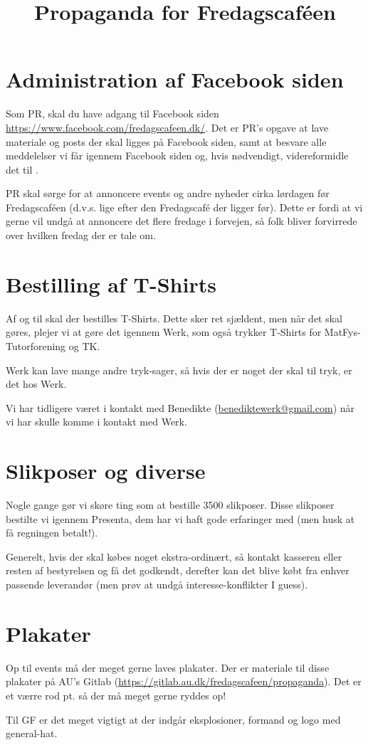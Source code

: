 

\title{Propaganda for Fredagscaféen}
\date{}



\maketitle

\section{Administration af Facebook siden}
Som PR, skal du have adgang til Facebook siden \url{https://www.facebook.com/fredagscafeen.dk/}. Det er PR's opgave at lave materiale og posts der skal ligges på Facebook siden, samt at besvare alle meddelelser vi får igennem Facebook siden og, hvis nødvendigt, videreformidle det til \bestmail.

PR skal sørge for at annoncere events og andre nyheder cirka lørdagen før Fredagscaféen (d.v.s. lige efter den Fredagscafé der ligger før). Dette er fordi at vi gerne vil undgå at annoncere det flere fredage i forvejen, så folk bliver forvirrede over hvilken fredag der er tale om.

\section{Bestilling af T-Shirts}
Af og til skal der bestilles T-Shirts. Dette sker ret sjældent, men når det skal gøres, plejer vi at gøre det igennem Werk, som også trykker T-Shirts for MatFys-Tutorforening og TK.

Werk kan lave mange andre tryk-sager, så hvis der er noget der skal til tryk, er det hos Werk.

Vi har tidligere været i kontakt med Benedikte (\url{benediktewerk@gmail.com}) når vi har skulle komme i kontakt med Werk.

\section{Slikposer og diverse}
Nogle gange gør vi skøre ting som at bestille 3500 slikposer. Disse slikposer bestilte vi igennem Presenta, dem har vi haft gode erfaringer med (men husk at få regningen betalt!).

Generelt, hvis der skal købes noget ekstra-ordinært, så kontakt kasseren eller resten af bestyrelsen og få det godkendt, derefter kan det blive købt fra enhver passende leverandør (men prøv at undgå interesse-konflikter I guess).

\section{Plakater}
Op til events må der meget gerne laves plakater. Der er materiale til disse plakater på AU's Gitlab (\url{https://gitlab.au.dk/fredagscafeen/propaganda}). Det er et værre rod pt. så der må meget gerne ryddes op!

Til GF er det meget vigtigt at der indgår eksplosioner, formand og logo med general-hat.


